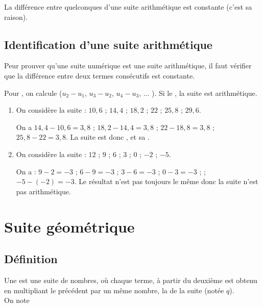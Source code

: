 \documentclass[12pt,a4paper]{article}
\begin{document}
\begin{myprop}
	La différence entre  quelconques d'une suite arithmétique est constante (c'est sa raison).
\end{myprop}

\subsection{Identification d'une suite arithmétique}
\begin{mymeth}
	Peur prouver qu'une suite numérique est une suite arithmétique, il faut vérifier que la différence entre deux termes consécutifs est constante.
	
	Pour , on calcule  ($u_2 - u_1$, $u_3 - u_2$, $u_4-u_3$, ... ). Si le , la suite est arithmétique.

\end{mymeth}

\begin{myexs}
	\begin{enumerate}
		\item On considère la suite : $10,6$ ; $14,4$ ; $18,2$ ; $22$ ; $25,8$ ; $29,6$.
		
		On a $14,4-10,6=3,8$ ; $18,2 -14,4=3,8$ ; $22 -18,8=3,8$ ; $25,8-22=3,8$.
		La suite est donc , et sa .
		
		\item On considère la suite : $12$ ; $9$ ; $6$ ; $3$ ; $0$ ; $-2$ ; $-5$.
		
		On a : $9-2=-3$  ; $6-9=-3$ ; $3-6=-3$ ; $0-3=-3$ ;  ; $-5-(-2)=-3$.
		Le résultat n'est pas toujours le même donc la suite n'est pas arithmétique.
	\end{enumerate}
\end{myexs}

\section{Suite géométrique}

\subsection{Définition}
\begin{mydef}
	Une  est une suite de nombres, où chaque terme, à partir du deuxième est obtenu en multipliant le précédent par un même nombre, la  de la suite (notée $q$).\\
	
	On note
\end{mydef}
\end{document}
